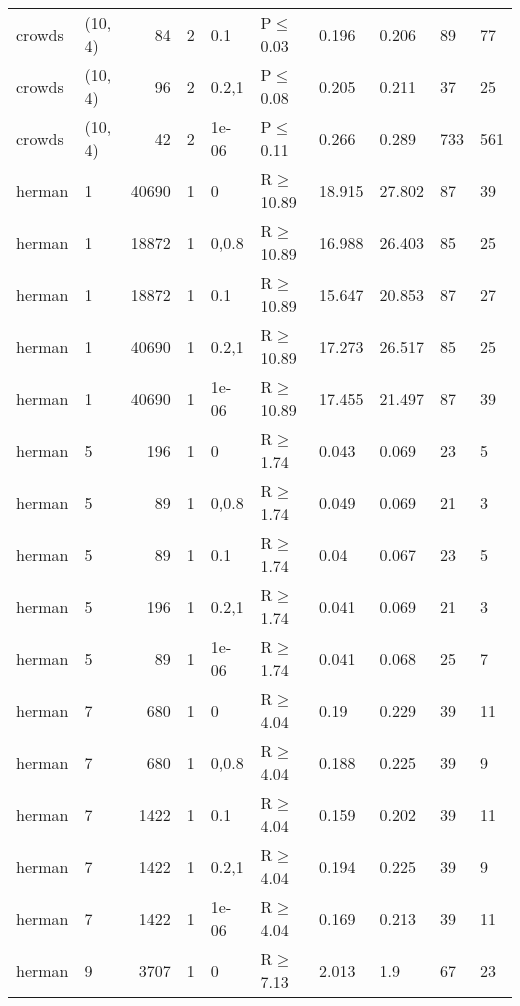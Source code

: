 \begin{longtable}{llrrllllll}
 crowds        & (10, 4)  &     	84 &   2 & 0.1   & P$\leq$0.03  & 0.196  & 0.206   & 89      & 77   \\
 crowds        & (10, 4)  &     	96 &   2 & 0.2,1 & P$\leq$0.08  & 0.205  & 0.211   & 37      & 25   \\
 crowds        & (10, 4)  &     	42 &   2 & 1e-06 & P$\leq$0.11  & 0.266  & 0.289   & 733     & 561  \\
 herman        & 1        &  	40690 &   1 & 0     & R$\geq$10.89 & 18.915 & 27.802  & 87      & 39   \\
 herman        & 1        &  	18872 &   1 & 0,0.8 & R$\geq$10.89 & 16.988 & 26.403  & 85      & 25   \\
 herman        & 1        &  	18872 &   1 & 0.1   & R$\geq$10.89 & 15.647 & 20.853  & 87      & 27   \\
 herman        & 1        &  	40690 &   1 & 0.2,1 & R$\geq$10.89 & 17.273 & 26.517  & 85      & 25   \\
 herman        & 1        &  	40690 &   1 & 1e-06 & R$\geq$10.89 & 17.455 & 21.497  & 87      & 39   \\
 herman        & 5        &    	196 &   1 & 0     & R$\geq$1.74  & 0.043  & 0.069   & 23      & 5    \\
 herman        & 5        &     	89 &   1 & 0,0.8 & R$\geq$1.74  & 0.049  & 0.069   & 21      & 3    \\
 herman        & 5        &     	89 &   1 & 0.1   & R$\geq$1.74  & 0.04   & 0.067   & 23      & 5    \\
 herman        & 5        &    	196 &   1 & 0.2,1 & R$\geq$1.74  & 0.041  & 0.069   & 21      & 3    \\
 herman        & 5        &     	89 &   1 & 1e-06 & R$\geq$1.74  & 0.041  & 0.068   & 25      & 7    \\
 herman        & 7        &    	680 &   1 & 0     & R$\geq$4.04  & 0.19   & 0.229   & 39      & 11   \\
 herman        & 7        &    	680 &   1 & 0,0.8 & R$\geq$4.04  & 0.188  & 0.225   & 39      & 9    \\
 herman        & 7        &   	1422 &   1 & 0.1   & R$\geq$4.04  & 0.159  & 0.202   & 39      & 11   \\
 herman        & 7        &   	1422 &   1 & 0.2,1 & R$\geq$4.04  & 0.194  & 0.225   & 39      & 9    \\
 herman        & 7        &   	1422 &   1 & 1e-06 & R$\geq$4.04  & 0.169  & 0.213   & 39      & 11   \\
 herman        & 9        &   	3707 &   1 & 0     & R$\geq$7.13  & 2.013  & 1.9     & 67      & 23   \\

\end{longtable}
